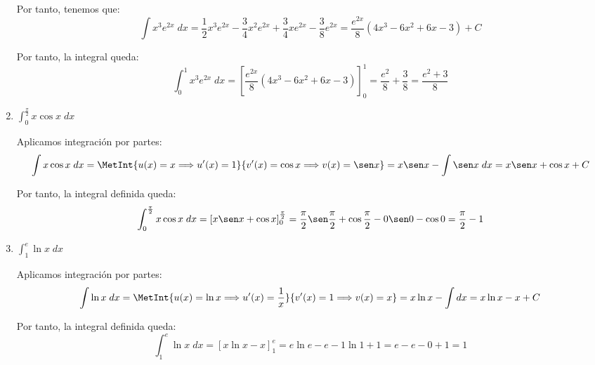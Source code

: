 \begin{ejercicio}
\begin{enumerate}
        Por tanto, tenemos que:
        \begin{equation*}
            \int x^3 e^{2x}\;dx = \frac{1}{2}x^3 e^{2x} - \frac{3}{4}x^2 e^{2x} + \frac{3}{4}x e^{2x} - \frac{3}{8}e^{2x}
            = \frac{e^{2x}}{8}\left(4x^3-6x^2+6x-3\right)+C
        \end{equation*}

        Por tanto, la integral queda:
        \begin{equation*}
            \int_0^1 x^3 e^{2x}\;dx
            = \left[\frac{e^{2x}}{8}\left(4x^3-6x^2+6x-3\right)\right]_0^1
            = \frac{e^2}{8}+\frac{3}{8} = \frac{e^2+3}{8}
        \end{equation*}

        \item $\displaystyle \int_0^{\frac{\pi}{2}} x\cos x\;dx$
        
        Aplicamos integración por partes:
        \begin{equation*}
            \int x\cos x\;dx
            = \MetInt{u(x)=x \Longrightarrow u'(x)=1}{v'(x)=\cos x \Longrightarrow v(x)=\sen x}
            = x\sen x - \int \sen x\;dx
            = x\sen x + \cos x+C
        \end{equation*}

        Por tanto, la integral definida queda:
        \begin{equation*}
            \int_0^{\frac{\pi}{2}} x\cos x\;dx
            = \left[x\sen x + \cos x\right]_0^{\frac{\pi}{2}}
            = \frac{\pi}{2}\sen \frac{\pi}{2} + \cos \frac{\pi}{2} - 0\sen 0 - \cos 0
            = \frac{\pi}{2} - 1
        \end{equation*}

        \item $\displaystyle \int_1^e \ln x\;dx$
        
        Aplicamos integración por partes:
        \begin{equation*}
            \int \ln x\;dx
            = \MetInt{u(x)=\ln x \Longrightarrow u'(x)=\frac{1}{x}}{v'(x)=1 \Longrightarrow v(x)=x}
            = x\ln x - \int dx
            = x\ln x - x + C
        \end{equation*}

        Por tanto, la integral definida queda:
        \begin{equation*}
            \int_1^e \ln x\;dx
            = \left[x\ln x - x\right]_1^e
            = e\ln e - e - 1\ln 1 + 1
            = e - e - 0 + 1 = 1
        \end{equation*}


\end{enumerate}
\end{ejercicio}
